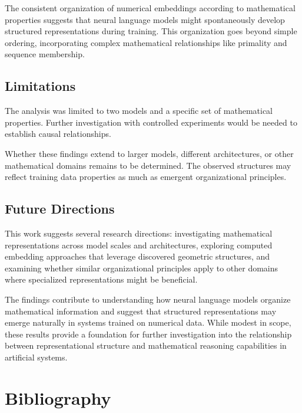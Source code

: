 \documentclass[
  a4paper, twoside, 10pt, titlepage]{book}
\begin{document}
The consistent organization of numerical embeddings according to
mathematical properties suggests that neural language models might
spontaneously develop structured representations during training. This
organization goes beyond simple ordering, incorporating complex
mathematical relationships like primality and sequence membership.

\section{Limitations}\label{limitations}

The analysis was limited to two models and a specific set of
mathematical properties. Further investigation with controlled
experiments would be needed to establish causal relationships.

Whether these findings extend to larger models, different architectures,
or other mathematical domains remains to be determined. The observed
structures may reflect training data properties as much as emergent
organizational principles.

\section{Future Directions}\label{future-directions}

This work suggests several research directions: investigating
mathematical representations across model scales and architectures,
exploring computed embedding approaches that leverage discovered
geometric structures, and examining whether similar organizational
principles apply to other domains where specialized representations
might be beneficial.

The findings contribute to understanding how neural language models
organize mathematical information and suggest that structured
representations may emerge naturally in systems trained on numerical
data. While modest in scope, these results provide a foundation for
further investigation into the relationship between representational
structure and mathematical reasoning capabilities in artificial systems.

\chapter*{Bibliography}\label{bibliography}
\end{document}
